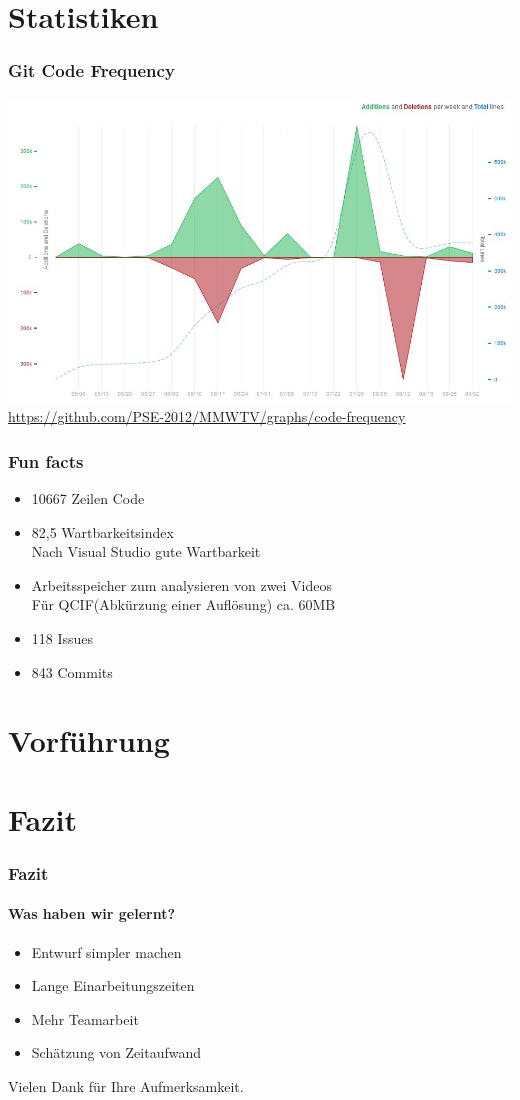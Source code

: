 \documentclass[t]{beamer}
\begin{document}
\section{Statistiken}
\begin{frame}
	\frametitle{Git Code Frequency}
	\includegraphics[scale=.33]{img/GitCodeFrequency.jpg}\\
	\hyperlink{Git Code Frequency}{https://github.com/PSE-2012/MMWTV/graphs/code-frequency}
\end{frame}
\begin{frame}
	\frametitle{Fun facts}
	\begin{itemize}
	\item <+-> 10667 Zeilen Code
	\item <+-> 82,5 Wartbarkeitsindex\\
	Nach Visual Studio gute Wartbarkeit
	\item <+-> Arbeitsspeicher zum analysieren von zwei Videos\\
	Für  QCIF(Abkürzung einer Auflösung) ca. 60MB
	\item <+-> 118 Issues 
	\item <+-> 843 Commits 
	\end{itemize}
\end{frame}
\section{Vorführung}
\section{Fazit}
\begin{frame}
	\frametitle{Fazit}
	\framesubtitle{Was haben wir gelernt?}
	\begin{itemize}
	\item <+-> Entwurf simpler machen
	\item <+-> Lange Einarbeitungszeiten
	\item <+-> Mehr Teamarbeit
	\item <+-> Schätzung von Zeitaufwand
	\end{itemize}
\end{frame}
\begin{frame}[c]
	Vielen Dank für Ihre Aufmerksamkeit.
\end{frame}
\end{document}
